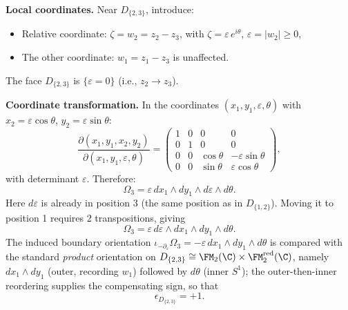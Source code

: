 \textbf{Local coordinates.} Near $D_{\{2,3\}}$, introduce:
\begin{itemize}
\item Relative coordinate: $\zeta = w_2 = z_2 - z_3$, with $\zeta = \varepsilon\,e^{i\theta}$, $\varepsilon = |w_2| \ge 0$,
\item The other coordinate: $w_1 = z_1 - z_3$ is unaffected.
\end{itemize}
The face $D_{\{2,3\}}$ is $\{\varepsilon = 0\}$ (i.e., $z_2 \to z_3$).

\textbf{Coordinate transformation.} In the coordinates $(x_1,y_1,\varepsilon,\theta)$ with $x_2 = \varepsilon\cos\theta$, $y_2 = \varepsilon\sin\theta$:
\[
\frac{\partial(x_1,y_1,x_2,y_2)}{\partial(x_1,y_1,\varepsilon,\theta)} = \begin{pmatrix} 1&0&0&0\\ 0&1&0&0\\ 0&0&\cos\theta&-\varepsilon\sin\theta\\ 0&0&\sin\theta&\varepsilon\cos\theta\end{pmatrix},
\]
with determinant $\varepsilon$. Therefore:
\[
\Omega_3 = \varepsilon\,dx_1\wedge dy_1\wedge d\varepsilon\wedge d\theta.
\]
Here $d\varepsilon$ is already in position 3 (the same position as in $D_{\{1,2\}}$). Moving it to position 1 requires 2 transpositions, giving
\[
\Omega_3 = \varepsilon\,d\varepsilon\wedge dx_1\wedge dy_1\wedge d\theta.
\]
The induced boundary orientation $\iota_{-\partial_\varepsilon}\Omega_3 = -\varepsilon\,dx_1\wedge dy_1\wedge d\theta$ is compared with the standard \emph{product} orientation on $D_{\{2,3\}} \cong \FM_2(\C) \times \FM_2^{\mathrm{red}}(\C)$, namely $dx_1\wedge dy_1$ (outer, recording $w_1$) followed by $d\theta$ (inner $S^1$); the outer-then-inner reordering supplies the compensating sign, so that
\begin{equation}
\label{eq:eps-D23}
\boxed{\epsilon_{D_{\{2,3\}}} = +1.}
\end{equation}

